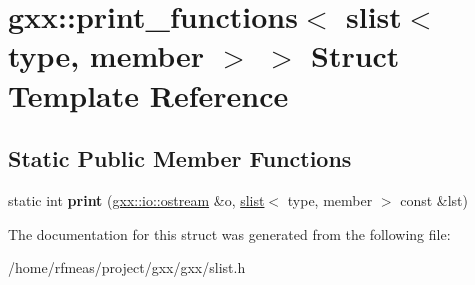 \hypertarget{structgxx_1_1print__functions_3_01slist_3_01type_00_01member_01_4_01_4}{}\section{gxx\+:\+:print\+\_\+functions$<$ slist$<$ type, member $>$ $>$ Struct Template Reference}
\label{structgxx_1_1print__functions_3_01slist_3_01type_00_01member_01_4_01_4}
\subsection*{Static Public Member Functions}
\begin{DoxyCompactItemize}
\item 
static int {\bfseries print} (\hyperlink{classgxx_1_1io_1_1ostream}{gxx\+::io\+::ostream} \&o, \hyperlink{classgxx_1_1slist}{slist}$<$ type, member $>$ const \&lst)\hypertarget{structgxx_1_1print__functions_3_01slist_3_01type_00_01member_01_4_01_4_a9ce0754a25bf7ad48e96b7146c3e17dc}{}\label{structgxx_1_1print__functions_3_01slist_3_01type_00_01member_01_4_01_4_a9ce0754a25bf7ad48e96b7146c3e17dc}

\end{DoxyCompactItemize}


The documentation for this struct was generated from the following file\+:\begin{DoxyCompactItemize}
\item 
/home/rfmeas/project/gxx/gxx/slist.\+h\end{DoxyCompactItemize}
